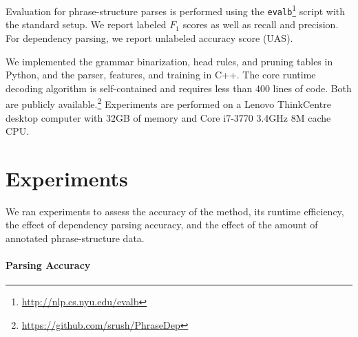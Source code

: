 \documentclass[11pt,letterpaper]{article}
\newcommand{\ParserUrl}{\url{https://github.com/srush/PhraseDep}}
\newcommand{\nascomment}[1]{\textcolor{blue}{\bf \small [#1 --nas]}}
\begin{document}

Evaluation for phrase-structure parses is performed using the
\texttt{evalb}\footnote{\url{http://nlp.cs.nyu.edu/evalb}} script with the
standard setup. We report labeled $F_1$ scores as well as recall and
precision. For dependency parsing, we report unlabeled accuracy score
(UAS).

We implemented the grammar binarization, head rules, and pruning
tables in Python, and the parser, features, and training in C++. The
core runtime decoding algorithm is self-contained and requires less
than 400 lines of code. Both are publicly available.\footnote{\ParserUrl} Experiments are performed on a Lenovo ThinkCentre desktop computer
with 32GB of memory and  Core i7-3770 3.4GHz 8M cache CPU.



\section{Experiments}
\label{sec:exper}

We ran experiments to assess the accuracy of the method, its runtime
efficiency, the effect of dependency parsing accuracy,
and the effect of the amount of annotated phrase-structure
data.


\paragraph{Parsing Accuracy}
\end{document}

